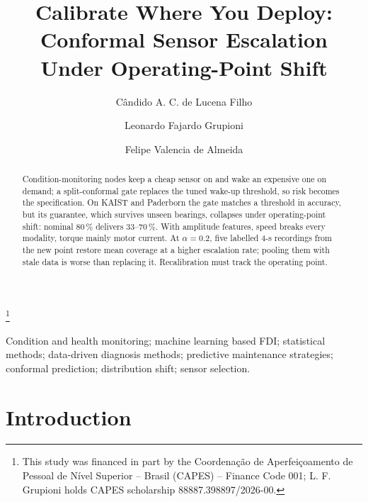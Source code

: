 \documentclass{ifacconf}
\begin{document}
\begin{frontmatter}

\title{Calibrate Where You Deploy:\\ Conformal Sensor Escalation Under Operating-Point Shift}

\thanks[footnoteinfo]{This study was financed in part by the Coordena\c{c}\~ao de Aperfei\c{c}oamento de Pessoal de N\'ivel Superior -- Brasil (CAPES) -- Finance Code 001; L. F. Grupioni holds CAPES scholarship 88887.398897/2026-00.}

\author[USP]{C\^andido A. C. de Lucena Filho}
\author[USP]{Leonardo Fajardo Grupioni}
\author[USP]{Felipe Valencia de Almeida}

\address[USP]{Polytechnic School of the Universidade de S\~ao Paulo, S\~ao Paulo, SP, Brazil (e-mail: candidoalfredo@usp.br, leogrupioni@usp.br, fvalencia@usp.br).}

\begin{abstract}
Condition-monitoring nodes keep a cheap sensor on and wake an expensive one on demand; a split-conformal gate replaces the tuned wake-up threshold, so risk becomes the specification. On KAIST and Paderborn the gate matches a threshold in accuracy, but its guarantee, which survives unseen bearings, collapses under operating-point shift: nominal 80\,\% delivers 33--70\,\%. With amplitude features, speed breaks every modality, torque mainly motor current. At $\alpha=0.2$, five labelled 4-s recordings from the new point restore mean coverage at a higher escalation rate; pooling them with stale data is worse than replacing it. Recalibration must track the operating point.
\end{abstract}

\begin{keyword}
Condition and health monitoring; machine learning based FDI; statistical methods; data-driven diagnosis methods; predictive maintenance strategies; conformal prediction; distribution shift; sensor selection.
\end{keyword}

\end{frontmatter}



\section{Introduction}
\end{document}
